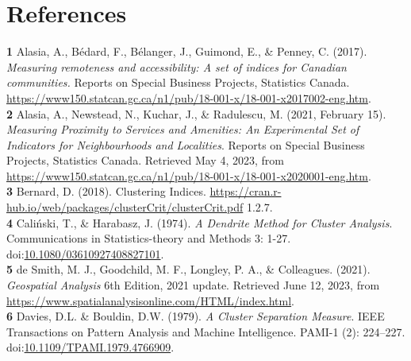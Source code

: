\documentclass[11pt, a4paper]{article}
\begin{document}
\pagebreak
\section{References}




\noindent\textbf{1} Alasia, A., Bédard, F., Bélanger, J., Guimond, E., \& Penney, C. (2017). \textit{Measuring remoteness and accessibility: A set of indices for Canadian communities.} Reports on Special Business Projects, Statistics Canada. \sloppy\url{https://www150.statcan.gc.ca/n1/pub/18-001-x/18-001-x2017002-eng.htm}. \\

\noindent\textbf{2} Alasia, A., Newstead, N., Kuchar, J., \& Radulescu, M. (2021, February 15). \textit{Measuring Proximity to Services and Amenities: An Experimental Set of Indicators for Neighbourhoods and Localities}. Reports on Special Business Projects, Statistics Canada. Retrieved May 4, 2023, from \sloppy\url{https://www150.statcan.gc.ca/n1/pub/18-001-x/18-001-x2020001-eng.htm}.  \\


\noindent\textbf{3} Bernard, D. (2018). Clustering Indices. \sloppy\url{https://cran.r-hub.io/web/packages/clusterCrit/clusterCrit.pdf} 1.2.7. \\

\noindent\textbf{4} Caliński, T., \& Harabasz, J. (1974). \textit{A Dendrite Method for Cluster Analysis}. Communications in Statistics-theory and Methods 3: 1-27. doi:\sloppy\url{10.1080/03610927408827101}. \\

\noindent\textbf{5} de Smith, M. J., Goodchild, M. F., Longley, P. A., \& Colleagues. (2021). \textit{Geospatial Analysis} 6th Edition, 2021 update. Retrieved June 12, 2023, from \sloppy\url{https://www.spatialanalysisonline.com/HTML/index.html}. \\

\noindent\textbf{6} Davies, D.L. \& Bouldin, D.W. (1979). \textit{A Cluster Separation Measure}. IEEE Transactions on Pattern Analysis and Machine Intelligence. PAMI-1 (2): 224–227. doi:\sloppy\url{10.1109/TPAMI.1979.4766909}. \\
\end{document}
